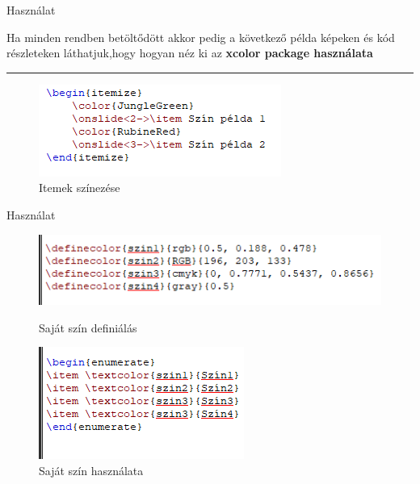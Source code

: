 \documentclass[aspectratio=1610,dvipsnames,xcolor=table]{beamer}
\begin{document}
\begin{frame}[fragile]{Használat}
\begin{center}
Ha minden rendben betöltődött akkor pedig a következő példa képeken és kód részleteken láthatjuk,hogy hogyan néz ki az \textbf{xcolor package használata}
\noindent
{\color{Dandelion} \rule{\linewidth}{1mm}}
\end{center}
	
	\begin{figure}[H]
			 \includegraphics[scale=0.8]{img/itemszinezes.png}
			 \onslide<2->\caption{Itemek színezése}
	\end{figure}
\end{frame}


\begin{frame}[fragile]{Használat}

\begin{figure}[H]
\includegraphics[scale=0.9]{img/itemszinezes2.1.png} 
\caption{Saját szín definiálás}
\includegraphics[scale=0.9]{img/itemszinezes2.png}
\caption{Saját szín használata}
\end{figure}
\end{frame}
\end{document}

